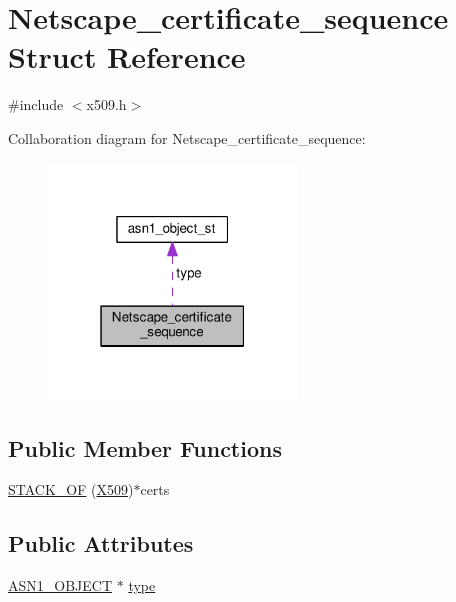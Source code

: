 \hypertarget{struct_netscape__certificate__sequence}{}\section{Netscape\+\_\+certificate\+\_\+sequence Struct Reference}
\label{struct_netscape__certificate__sequence}


{\ttfamily \#include $<$x509.\+h$>$}



Collaboration diagram for Netscape\+\_\+certificate\+\_\+sequence\+:
\nopagebreak
\begin{figure}[H]
\begin{center}
\leavevmode
\includegraphics[width=187pt]{struct_netscape__certificate__sequence__coll__graph}
\end{center}
\end{figure}
\subsection*{Public Member Functions}
\begin{DoxyCompactItemize}
\item 
\hyperlink{struct_netscape__certificate__sequence_aa4ffb7847fcdf0e15483c03c5009906a}{S\+T\+A\+C\+K\+\_\+\+OF} (\hyperlink{ossl__typ_8h_a4f666bde6518f95deb3050c54b408416}{X509})$\ast$certs
\end{DoxyCompactItemize}
\subsection*{Public Attributes}
\begin{DoxyCompactItemize}
\item 
\hyperlink{asn1_8h_ae10c08e4e6b23f67a39b2add932ec48f}{A\+S\+N1\+\_\+\+O\+B\+J\+E\+CT} $\ast$ \hyperlink{struct_netscape__certificate__sequence_afd433b93f52456a10aaf3d824b295a94}{type}
\end{DoxyCompactItemize}


